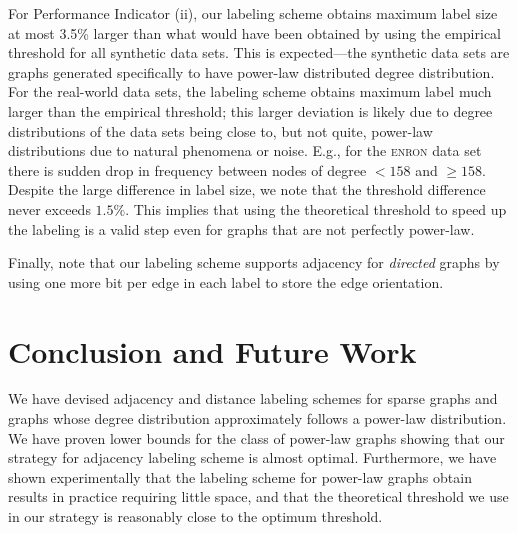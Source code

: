  For Performance Indicator (ii), our labeling scheme obtains maximum label size at most 3.5\% larger than what would have been obtained by using the empirical threshold for all synthetic data sets.
This is expected---the synthetic data sets are graphs generated specifically to have power-law distributed degree distribution. 
For the real-world data sets, the labeling scheme obtains maximum label much larger than the empirical threshold; this larger deviation is likely due to degree distributions of the data sets being close to, but not quite,
power-law distributions due to natural phenomena or noise. E.g., for the \textsc{enron} data set there is sudden drop in frequency between nodes of degree $< 158$ and $\geq 158$. Despite the large difference in label size, we note that the threshold difference never exceeds $1.5\%$. This implies that using the theoretical threshold to speed up the labeling is a valid step even for graphs that are not perfectly power-law.


Finally, note that our labeling scheme supports adjacency for \emph{directed} graphs by using one more bit per edge in each label to store the edge orientation.
\section{Conclusion and Future Work}
We have devised adjacency and distance labeling schemes for sparse graphs and graphs whose degree distribution approximately follows a power-law distribution.
 We have proven lower bounds for the class of power-law graphs showing that our strategy for adjacency labeling scheme is  almost  optimal. 
 Furthermore, we have shown experimentally that the labeling scheme for power-law graphs obtain
results in practice requiring little  space, and that the theoretical threshold we use in our strategy is reasonably close to the optimum threshold.

